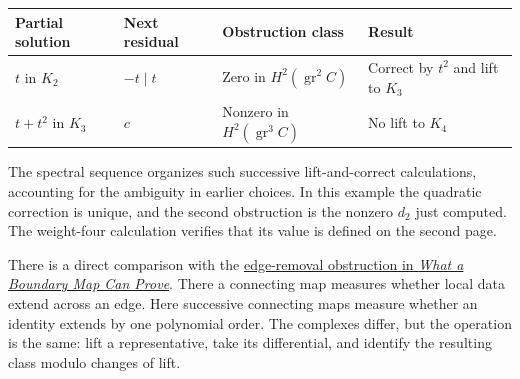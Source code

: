 \documentclass[11pt,letterpaper]{article}
\begin{document}
\begin{center}\begingroup\small\setlength{\tabcolsep}{5pt}\renewcommand{\arraystretch}{1.2}
\begin{tabularx}{\linewidth}{@{}>{\raggedright\arraybackslash}X>{\raggedright\arraybackslash}X>{\raggedright\arraybackslash}X>{\raggedright\arraybackslash}X@{}}
\toprule
\textbf{Partial solution} & \textbf{Next residual} & \textbf{Obstruction class} & \textbf{Result} \\
\midrule
\(
t
\) in \(
K_2
\) & \(
-t\mid t
\) & Zero in \(
H^2(\operatorname{gr}^2 C)
\) & Correct by \(
t^2
\) and lift to \(
K_3
\) \\
\(
t+t^2
\) in \(
K_3
\) & \(
c
\) & Nonzero in \(
H^2(\operatorname{gr}^3 C)
\) & No lift to \(
K_4
\) \\
\bottomrule
\end{tabularx}\endgroup\end{center}

The spectral sequence organizes such successive lift-and-correct calculations, accounting for the ambiguity in earlier choices. In this example the quadratic correction is unique, and the second obstruction is the nonzero \(
d_2
\) just computed. The weight-four calculation verifies that its value is defined on the second page.


There is a direct comparison with the \href{https://refactor.press/notes/what-a-boundary-map-can-prove.html\#removing-an-edge-produces-an-obstruction-map}{edge-removal obstruction in \emph{What a Boundary Map Can Prove}}. There a connecting map measures whether local data extend across an edge. Here successive connecting maps measure whether an identity extends by one polynomial order. The complexes differ, but the operation is the same: lift a representative, take its differential, and identify the resulting class modulo changes of lift.
\end{document}
